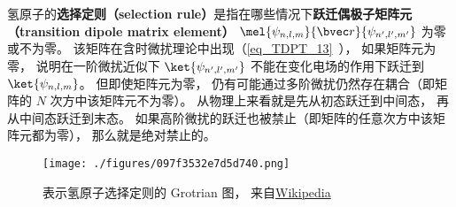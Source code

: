 

氢原子的\textbf{选择定则（selection rule）}是指在哪些情况下\textbf{跃迁偶极子矩阵元（transition dipole matrix element）} $\mel{\psi_{n,l,m}}{\bvec r}{\psi_{n',l',m'}}$ 为零或不为零。 该矩阵在含时微扰理论中出现（\autoref{eq_TDPT_13}~）， 如果矩阵元为零， 说明在一阶微扰近似下 $\ket{\psi_{n',l',m'}}$ 不能在变化电场的作用下跃迁到 $\ket{\psi_{n,l,m}}$。 但即使矩阵元为零， 仍有可能通过多阶微扰仍然存在耦合（即矩阵的 $N$ 次方中该矩阵元不为零）。 从物理上来看就是先从初态跃迁到中间态， 再从中间态跃迁到末态。 如果高阶微扰的跃迁也被禁止（即矩阵的任意次方中该矩阵元都为零）， 那么就是绝对禁止的。 %

\begin{figure}[ht]
\centering
\texttt{[image: ./figures/097f3532e7d5d740.png]}
\caption{表示氢原子选择定则的 Grotrian 图， 来自\href{https://en.wikipedia.org/wiki/Grotrian_diagram}{Wikipedia}} \label{fig_SelRul_1}
\end{figure}

